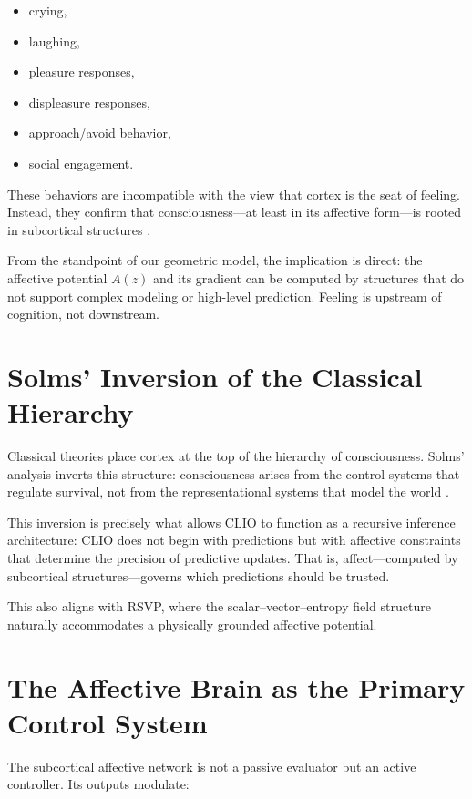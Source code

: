 \documentclass[12pt,oneside]{book}
\theoremstyle{plain}
\theoremstyle{definition}
\let\citep\parencite
\begin{document}
\begin{itemize}
    \item crying,
    \item laughing,
    \item pleasure responses,
    \item displeasure responses,
    \item approach/avoid behavior,
    \item social engagement.
\end{itemize}

These behaviors are incompatible with the view that cortex is the seat of
feeling.
Instead, they confirm that consciousness—at least in its affective form—is
rooted in subcortical structures \citep{solms2021hidden}.

From the standpoint of our geometric model, the implication is direct:
the affective potential $A(z)$ and its gradient can be computed by structures
that do not support complex modeling or high-level prediction.
Feeling is upstream of cognition, not downstream.

\section{Solms’ Inversion of the Classical Hierarchy}

Classical theories place cortex at the top of the hierarchy of consciousness.
Solms’ analysis inverts this structure:
consciousness arises from the control systems that regulate survival,
not from the representational systems that model the world
\citep{solms2021hidden}.

This inversion is precisely what allows CLIO to function as a
recursive inference architecture:
CLIO does not begin with predictions but with affective constraints
that determine the precision of predictive updates.
That is, affect—computed by subcortical structures—governs which predictions
should be trusted.

This also aligns with RSVP, where the scalar–vector–entropy field structure
naturally accommodates a physically grounded affective potential.

\section{The Affective Brain as the Primary Control System}

The subcortical affective network is not a passive evaluator but an
active controller.
Its outputs modulate:
\end{document}
